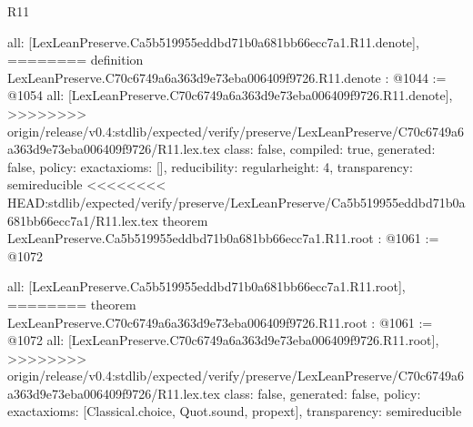 \begin{lexlean}{R11}
\begin{coremodule}
{{{{{{{{{{{{  all: [LexLeanPreserve.Ca5b519955eddbd71b0a681bb66ecc7a1.R11.denote],
========
definition LexLeanPreserve.C70c6749a6a363d9e73eba006409f9726.R11.denote : @1044 := @1054 {
  all: [LexLeanPreserve.C70c6749a6a363d9e73eba006409f9726.R11.denote],
>>>>>>>> origin/release/v0.4:stdlib/expected/verify/preserve/LexLeanPreserve/C70c6749a6a363d9e73eba006409f9726/R11.lex.tex
  class: false,
  compiled: true,
  generated: false,
  policy: exact{axioms: []},
  reducibility: regular{height: 4},
  transparency: semireducible
}
<<<<<<<< HEAD:stdlib/expected/verify/preserve/LexLeanPreserve/Ca5b519955eddbd71b0a681bb66ecc7a1/R11.lex.tex
theorem LexLeanPreserve.Ca5b519955eddbd71b0a681bb66ecc7a1.R11.root : @1061 := @1072 {
  all: [LexLeanPreserve.Ca5b519955eddbd71b0a681bb66ecc7a1.R11.root],
========
theorem LexLeanPreserve.C70c6749a6a363d9e73eba006409f9726.R11.root : @1061 := @1072 {
  all: [LexLeanPreserve.C70c6749a6a363d9e73eba006409f9726.R11.root],
>>>>>>>> origin/release/v0.4:stdlib/expected/verify/preserve/LexLeanPreserve/C70c6749a6a363d9e73eba006409f9726/R11.lex.tex
  class: false,
  generated: false,
  policy: exact{axioms: [Classical.choice, Quot.sound, propext]},
  transparency: semireducible
}

}}}}}}}}}}}}}
\end{coremodule}
\end{lexlean}
